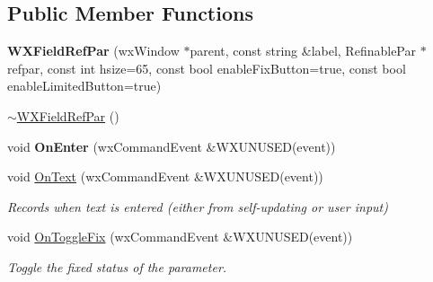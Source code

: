 \subsection*{Public Member Functions}
\begin{DoxyCompactItemize}
\item 
\mbox{\label{class_obj_cryst_1_1_w_x_field_ref_par_aaf2cf0819123a666866a4602ca5de448}} 
{\bfseries W\+X\+Field\+Ref\+Par} (wx\+Window $\ast$parent, const string \&label, Refinable\+Par $\ast$refpar, const int hsize=65, const bool enable\+Fix\+Button=true, const bool enable\+Limited\+Button=true)
\item 
\mbox{\hyperlink{class_obj_cryst_1_1_w_x_field_ref_par_a7a79f02ae0835128939e35f761a042f0}{$\sim$\+W\+X\+Field\+Ref\+Par}} ()
\item 
\mbox{\label{class_obj_cryst_1_1_w_x_field_ref_par_a6bee091b30800606ab221141e755377a}} 
void {\bfseries On\+Enter} (wx\+Command\+Event \&W\+X\+U\+N\+U\+S\+ED(event))
\item 
\mbox{\label{class_obj_cryst_1_1_w_x_field_ref_par_a2b31ab79f3e0f4e288b6ba53eff40c9e}} 
void \mbox{\hyperlink{class_obj_cryst_1_1_w_x_field_ref_par_a2b31ab79f3e0f4e288b6ba53eff40c9e}{On\+Text}} (wx\+Command\+Event \&W\+X\+U\+N\+U\+S\+ED(event))
\begin{DoxyCompactList}\small\item\em Records when text is entered (either from self-\/updating or user input) \end{DoxyCompactList}\item 
\mbox{\label{class_obj_cryst_1_1_w_x_field_ref_par_a8e9538c35aaf65e427b53fbc5889d4b9}} 
void \mbox{\hyperlink{class_obj_cryst_1_1_w_x_field_ref_par_a8e9538c35aaf65e427b53fbc5889d4b9}{On\+Toggle\+Fix}} (wx\+Command\+Event \&W\+X\+U\+N\+U\+S\+ED(event))
\begin{DoxyCompactList}\small\item\em Toggle the \textquotesingle{}fixed\textquotesingle{} status of the parameter. \end{DoxyCompactList}\item 
\mbox{\label{class_obj_cryst_1_1_w_x_field_ref_par_a9629d247dbfb8cf94f42b069753c7cf7}} 

\end{DoxyCompactItemize}

